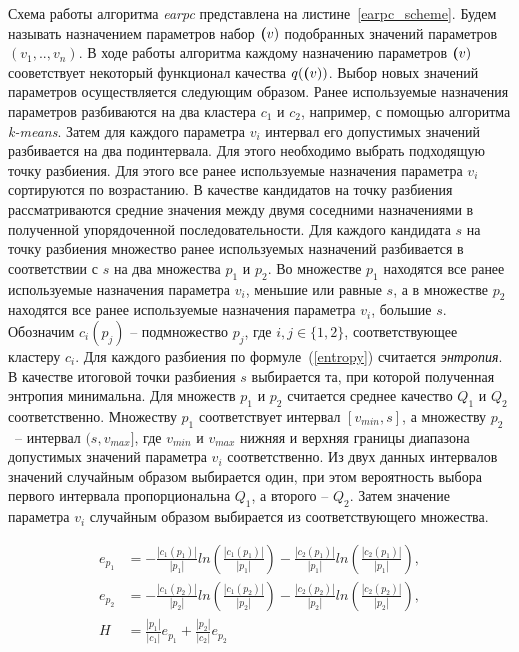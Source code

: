 Схема работы алгоритма \textit{earpc} представлена на листине~\ref{earpc_scheme}. Будем называть назначением параметров набор $\textbf(v)$ подобранных значений параметров $(v_1, .., v_n)$. В ходе работы алгоритма каждому назначению параметров $\textbf(v)$ сооветствует некоторый функционал качества $q(\textbf(v))$. Выбор новых значений параметров осуществляется следующим образом. Ранее используемые назначения параметров разбиваются на два кластера $c_1$ и $c_2$, например, с помощью алгоритма \textit{k-means}. Затем для каждого параметра $v_i$ интервал его допустимых значений разбивается на два подинтервала. Для этого необходимо выбрать подходящую точку разбиения. Для этого все ранее используемые назначения параметра $v_i$ сортируются по возрастанию. В качестве кандидатов на точку разбиения рассматриваются средние значения между двумя соседними назначениями в полученной упорядоченной последовательности. Для каждого кандидата $s$ на точку разбиения  множество ранее используемых назначений разбивается в соответствии с $s$ на два множества $p_1$ и $p_2$. Во множестве $p_1$ находятся все ранее используемые назначения параметра $v_i$, меньшие или равные $s$, а в множестве $p_2$ находятся все ранее используемые назначения параметра $v_i$, большие $s$. 
Обозначим $c_i(p_j)$ -- подмножество $p_j$, где $i, j \in \{1, 2\}$,  соответствующее кластеру $c_i$. Для каждого разбиения по формуле~(\ref{entropy}) считается \textit{энтропия}. В качестве итоговой точки разбиения $s$ выбирается та, при которой полученная энтропия минимальна. Для множеств $p_1$ и $p_2$ считается среднее качество $Q_1$ и $Q_2$ соответственно. Множеству $p_1$ соответствует интервал $[v_{min}, s]$, а множеству $p_2$~-- интервал $(s, v_{max}]$, где $v_{min}$ и $v_{max}$ нижняя и верхняя границы диапазона допустимых значений параметра $v_{i}$ соответственно. Из двух данных интервалов значений случайным образом выбирается один, при этом вероятность выбора первого интервала пропорциональна $Q_1$, а второго -- $Q_2$. Затем значение параметра $v_i$ случайным образом выбирается из соответствующего множества. 

\begin{align}
\label{entropy}
e_{p_1} & = -\frac{|c_1(p_1)|}{|p_1|}ln(\frac{|c_1(p_1)|}{|p_1|}) -\frac{|c_2(p_1)|}{|p_1|}ln(\frac{|c_2(p_1)|}{|p_1|}), \nonumber \\
e_{p_2} & = -\frac{|c_1(p_2)|}{|p_2|}ln(\frac{|c_1(p_2)|}{|p_2|}) -\frac{|c_2(p_2)|}{|p_2|}ln(\frac{|c_2(p_2)|}{|p_2|}), \\
H & = \frac{|p_1|}{|c_1|}e_{p_1} + \frac{|p_2|}{|c_2|}e_{p_2} \nonumber 
\end{align}


